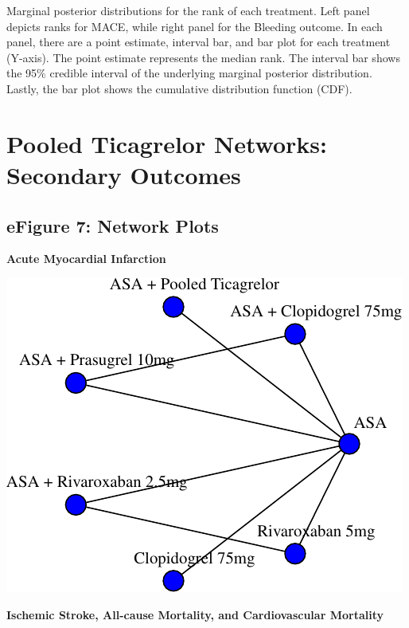 \documentclass[
  12pt,
]{article}
\begin{document}
Marginal posterior distributions for the rank of each treatment. Left
panel depicts ranks for MACE, while right panel for the Bleeding
outcome. In each panel, there are a point estimate, interval bar, and
bar plot for each treatment (Y-axis). The point estimate represents the
median rank. The interval bar shows the 95\% credible interval of the
underlying marginal posterior distribution. Lastly, the bar plot shows
the cumulative distribution function (CDF).

\newpage

\hypertarget{pooled-ticagrelor-networks-secondary-outcomes}{%
\section{Pooled Ticagrelor Networks: Secondary
Outcomes}\label{pooled-ticagrelor-networks-secondary-outcomes}}

\hypertarget{efigure-7-network-plots}{%
\subsection{eFigure 7: Network Plots}\label{efigure-7-network-plots}}

\textbf{Acute Myocardial Infarction}

\begin{center}\includegraphics{03_supplementary_files/figure-latex/unnamed-chunk-31-1} \end{center}

\textbf{Ischemic Stroke, All-cause Mortality, and Cardiovascular Mortality}
\end{document}
